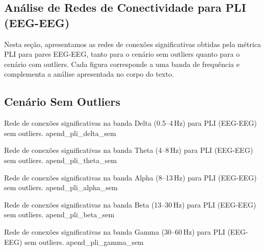 \begin{apendicesenv}

\partapendices
\chapter{Análise de Redes de Conectividade para PLI (EEG-EEG)}
\label{apendice:pli_eeg_eeg}

Nesta seção, apresentamos as redes de conexões significativas obtidas pela métrica PLI para pares EEG-EEG, tanto para o cenário sem outliers quanto para o cenário com outliers. Cada figura corresponde a uma banda de frequência e complementa a análise apresentada no corpo do texto.

\section{Cenário Sem Outliers}

{Rede de conexões significativas na banda Delta (0.5--4\,Hz) para PLI (EEG-EEG) sem outliers.}
{apend_pli_delta_sem}

{Rede de conexões significativas na banda Theta (4--8\,Hz) para PLI (EEG-EEG) sem outliers.}
{apend_pli_theta_sem}

{Rede de conexões significativas na banda Alpha (8--13\,Hz) para PLI (EEG-EEG) sem outliers.}
{apend_pli_alpha_sem}

{Rede de conexões significativas na banda Beta (13--30\,Hz) para PLI (EEG-EEG) sem outliers.}
{apend_pli_beta_sem}

{Rede de conexões significativas na banda Gamma (30--60\,Hz) para PLI (EEG-EEG) sem outliers.}
{apend_pli_gamma_sem}


\end{apendicesenv}
